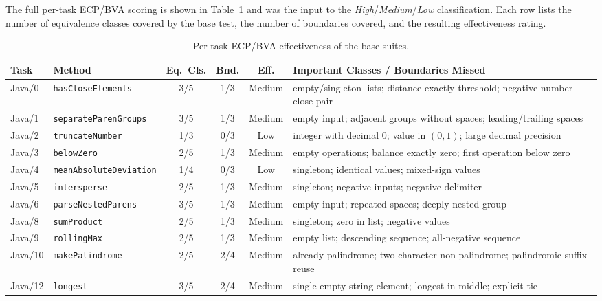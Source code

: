 \documentclass[journal]{IEEEtran}
\begin{document}
The full per-task ECP/BVA scoring is shown in
Table~\ref{tab:fulleff} and was the input to the
\emph{High}/\emph{Medium}/\emph{Low} classification. Each row
lists the number of equivalence classes covered by the base
test, the number of boundaries covered, and the resulting
effectiveness rating.

\begin{table}[!t]
\centering
\caption{Per-task ECP/BVA effectiveness of the base suites.}
\label{tab:fulleff}
\renewcommand{\arraystretch}{1.10}
\begin{tabular}{@{}l l c c c p{}@{}}
\toprule
\textbf{Task}
 & \textbf{Method}
 & \textbf{Eq.~Cls.}
 & \textbf{Bnd.}
 & \textbf{Eff.}
 & \textbf{Important Classes / Boundaries Missed} \\
\midrule
Java/0  & \texttt{hasCloseElements}     & 3/5 & 1/3 & Medium & empty/singleton lists; distance exactly threshold; negative-number close pair \\
Java/1  & \texttt{separateParenGroups}  & 3/5 & 1/3 & Medium & empty input; adjacent groups without spaces; leading/trailing spaces \\
Java/2  & \texttt{truncateNumber}       & 1/3 & 0/3 & Low    & integer with decimal $0$; value in $(0,1)$; large decimal precision \\
Java/3  & \texttt{belowZero}            & 2/5 & 1/3 & Medium & empty operations; balance exactly zero; first operation below zero \\
Java/4  & \texttt{meanAbsoluteDeviation}& 1/4 & 0/3 & Low    & singleton; identical values; mixed-sign values \\
Java/5  & \texttt{intersperse}          & 2/5 & 1/3 & Medium & singleton; negative inputs; negative delimiter \\
Java/6  & \texttt{parseNestedParens}    & 3/5 & 1/3 & Medium & empty input; repeated spaces; deeply nested group \\
Java/8  & \texttt{sumProduct}           & 2/5 & 1/3 & Medium & singleton; zero in list; negative values \\
Java/9  & \texttt{rollingMax}           & 2/5 & 1/3 & Medium & empty list; descending sequence; all-negative sequence \\
Java/10 & \texttt{makePalindrome}       & 2/5 & 2/4 & Medium & already-palindrome; two-character non-palindrome; palindromic suffix reuse \\
Java/12 & \texttt{longest}              & 3/5 & 2/4 & Medium & single empty-string element; longest in middle; explicit tie \\

\end{tabular}
\end{table}
\end{document}
